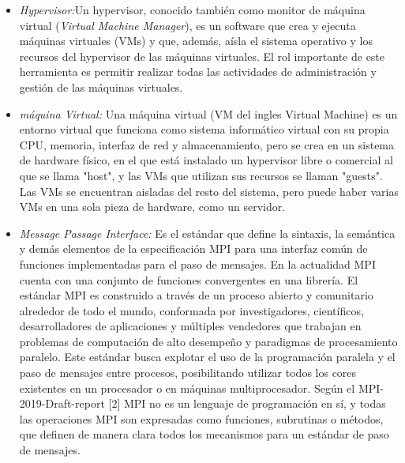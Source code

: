 \documentclass[letterpaper, 12pt, oneside]{article}
\begin{document}
    
    \begin{itemize}
         \item \textit{Hypervisor:}Un hypervisor, conocido también como monitor de máquina virtual (\textit{Virtual Machine Manager}), es un software que crea y ejecuta máquinas virtuales (VMs) y que, además, aísla el sistema operativo y los recursos del hypervisor de las máquinas virtuales. El rol importante de este herramienta es permitir realizar todas las actividades de administración y gestión de las máquinas virtuales.\cite{hypervisor}
        
        \item \textit{máquina Virtual:} Una máquina virtual (VM  del ingles Virtual Machine) es un entorno virtual que funciona como sistema informático virtual con su propia CPU, memoria, interfaz de red y almacenamiento, pero se crea en un sistema de hardware físico, en el que está instalado un hypervisor libre o comercial al que se llama "host", y las VMs que utilizan sus recursos se llaman "guests".  Las VMs se encuentran aisladas del resto del sistema, pero puede haber varias VMs en una sola pieza de hardware, como un servidor.\cite{virtualmachine}
        
        \item \textit{Message Passage Interface:} Es el estándar que define la sintaxis, la semántica y demás elementos de la especificación MPI para  una interfaz común de funciones implementadas para el paso de mensajes. 
        En la actualidad MPI cuenta con una conjunto de funciones convergentes en una librería. El estándar MPI es construido a través de un proceso abierto y comunitario alrededor de todo el mundo, conformada por investigadores, científicos, desarrolladores de aplicaciones y múltiples vendedores que trabajan en problemas de computación de alto desempeño y paradigmas de procesamiento paralelo. Este estándar busca explotar el uso de la programación paralela y el paso de mensajes entre procesos, posibilitando utilizar todos los cores existentes en un procesador o en máquinas multiprocesador.
        Según el MPI-2019-Draft-report\cite{MpiDraf} [2] MPI no es un lenguaje de programación en sí, y todas las operaciones MPI son expresadas como funciones, subrutinas o métodos, que definen de manera clara todos los mecanismos para un estándar de paso de mensajes.  
        

\end{itemize}
\end{document}
